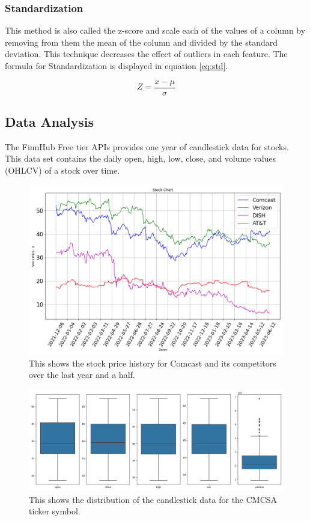 \documentclass[conference]{IEEEtran}
\begin{document}
\subsubsection{Standardization}

This method is also called the z-score and scale each of the values of a column by removing from them the mean of the column and divided by the standard deviation.
This technique decreases the effect of outliers in each feature. The formula for Standardization is displayed in equation \ref{eq:std}.

\begin{equation}
    Z = \frac{x - \mu}{\sigma}
    \label{eq:std}
\end{equation}


\subsection{Data Analysis}

The FinnHub Free tier APIs provides one year of candlestick data for stocks.
This data set contains the daily open, high, low, close, and volume values (OHLCV) of a stock over time.

\begin{figure}
    \includegraphics[width=\columnwidth]{stock_chart}
    \caption{This shows the stock price history for Comcast and its competitors over the last year and a half.}
\end{figure}

\begin{figure}
    \includegraphics[width=\columnwidth]{data_distribution}
    \caption{This shows the distribution of the candlestick data for the CMCSA ticker symbol.}
\end{figure}
\end{document}
